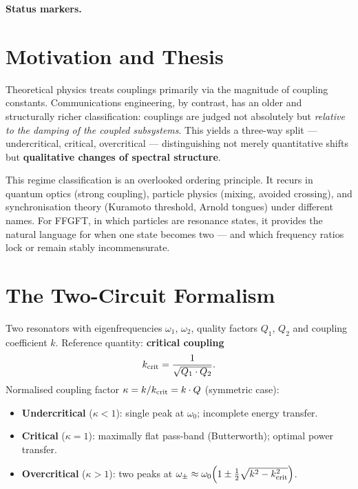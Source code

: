 \medskip\noindent\textbf{Status markers.}


\section{Motivation and Thesis}

Theoretical physics treats couplings primarily via the magnitude of coupling constants.
Communications engineering, by contrast, has an older and structurally richer
classification: couplings are judged not absolutely but \emph{relative to the damping
of the coupled subsystems}. This yields a three-way split — undercritical, critical,
overcritical — distinguishing not merely quantitative shifts but \textbf{qualitative
changes of spectral structure}.

\begin{tcolorbox}[ffgftbox,title={Thesis}]
This regime classification is an overlooked ordering principle. It recurs in quantum
optics (strong coupling), particle physics (mixing, avoided crossing), and
synchronisation theory (Kuramoto threshold, Arnold tongues) under different names.
For FFGFT, in which particles are resonance states, it provides the natural language
for when one state becomes two — and which frequency ratios lock or remain stably
incommensurate.
\end{tcolorbox}

\section{The Two-Circuit Formalism \E}

Two resonators with eigenfrequencies $\omega_1$, $\omega_2$, quality factors $Q_1$, $Q_2$
and coupling coefficient $k$. Reference quantity: \textbf{critical coupling}
\begin{equation}
  k_{\mathrm{crit}} = \frac{1}{\sqrt{Q_1 \cdot Q_2}}.
\end{equation}
Normalised coupling factor $\kappa = k/k_{\mathrm{crit}} = k\cdot Q$ (symmetric case):

\begin{itemize}
  \item \textbf{Undercritical} ($\kappa < 1$): single peak at $\omega_0$; incomplete energy transfer.
  \item \textbf{Critical} ($\kappa = 1$): maximally flat pass-band (Butterworth); optimal power transfer.
  \item \textbf{Overcritical} ($\kappa > 1$): two peaks at
    $\omega_\pm \approx \omega_0\!\left(1 \pm \tfrac{1}{2}\sqrt{k^2-k_{\mathrm{crit}}^2}\right)$.
\end{itemize}

